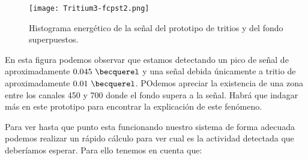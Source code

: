 \begin{figure}[hbtp]
\centering
\texttt{[image: Tritium3-fcpst2.png]}
\caption{Histograma energético de la señal del prototipo de tritios y del fondo superpuestos.\label{tritiofondo}}
\end{figure}

En esta figura podemos observar que estamos detectando un pico de señal de aproximadamente $0.045~\becquerel$ y una señal debida únicamente a tritio de aproximadamente $0.01~\becquerel$. POdemos apreciar la existencia de una zona entre los canales 450 y 700 donde el fondo supera a la señal. Habrá que indagar más en este prototipo para encontrar la explicación de este fenómeno.

Para ver hasta que punto esta funcionando nuestro sistema de forma adecuada podemos realizar un rápido cálculo para ver cual es la actividad detectada que deberíamos esperar. Para ello tenemos en cuenta que:
